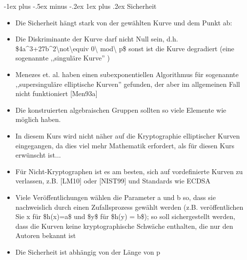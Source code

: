 \documentclass[a4paper]{article}
\makeatletter
\renewcommand{\subsubsection}{\@startsection{subsubsection}{3}{0mm}%
 {-1ex plus -.5ex minus -.2ex}%
 {1ex plus .2ex}%
 {\normalfont\small\bfseries}}
\makeatother
\begin{document}
\begin{multicols}{3}
    \subsubsection{Sicherheit}

    \begin{itemize}
        \item
              Die Sicherheit hängt stark von der gewählten Kurve und dem Punkt ab:
        \item
              Die Diskriminante der Kurve darf nicht Null sein, d.h.
              \$4a\^{}3+27b\^{}2\textbackslash not\textbackslash equiv
              0\textbackslash{} mod\textbackslash{} p\$ sonst ist die Kurve
              degradiert (eine sogenannte ,,singuläre Kurve'' )
        \item
              Menezes et. al. haben einen subexponentiellen Algorithmus für
              sogenannte ,,supersinguläre elliptische Kurven'' gefunden, der aber im
              allgemeinen Fall nicht funktioniert {[}Men93a{]}
        \item
              Die konstruierten algebraischen Gruppen sollten so viele Elemente wie
              möglich haben.
        \item
              In diesem Kurs wird nicht näher auf die Kryptographie elliptischer
              Kurven eingegangen, da dies viel mehr Mathematik erfordert, als für
              diesen Kurs erwünscht ist...
        \item
              Für Nicht-Kryptographen ist es am besten, sich auf vordefinierte
              Kurven zu verlassen, z.B. {[}LM10{]} oder {[}NIST99{]} und Standards
              wie ECDSA
        \item
              Viele Veröffentlichungen wählen die Parameter a und b so, dass sie
              nachweislich durch einen Zufallsprozess gewählt werden (z.B.
              veröffentlichen Sie x für \$h(x)=a\$ und \$y\$ für \$h(y) = b\$); so
              soll sichergestellt werden, dass die Kurven keine kryptographische
              Schwäche enthalten, die nur den Autoren bekannt ist
        \item
              Die Sicherheit ist abhängig von der Länge von p


\end{itemize}
\end{multicols}
\end{document}
